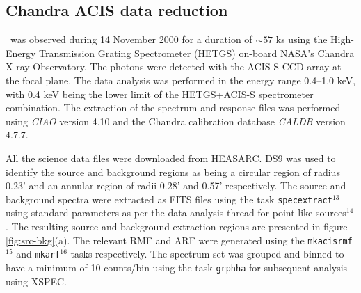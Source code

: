     \subsection{Chandra ACIS data reduction}
    	\source\ was observed during 14 November 2000 for a duration of $\sim 57$ ks using the High-Energy Transmission Grating Spectrometer (HETGS) on-board NASA's Chandra X-ray Observatory. %
    	The photons were detected with the ACIS-S CCD array at the focal plane. The data analysis was performed in the energy range 0.4--1.0 keV, with 0.4 keV being the lower limit of the HETGS+ACIS-S spectrometer combination. The extraction of the spectrum and response files was performed using \textit{CIAO} version 4.10 and the Chandra calibration database \textit{CALDB} version 4.7.7.
    	
    	All the science data files were downloaded from HEASARC. DS9 was used to identify the source and background regions as being a circular region of radius 0.23' and an annular region of radii 0.28' and 0.57' respectively. The source and background spectra were extracted as FITS files using the task \texttt{specextract}$^{13}$ using standard parameters as per the data analysis thread for point-like sources$^{14}$. The resulting source and background extraction regions are presented in figure \ref{fig:src-bkg}(a). The relevant RMF and ARF were generated using the \texttt{mkacisrmf}$^{15}$ and \texttt{mkarf}$^{16}$ tasks respectively. The spectrum set was grouped and binned to have a minimum of 10 counts/bin using the task \texttt{grphha} for subsequent analysis using XSPEC.
    	
